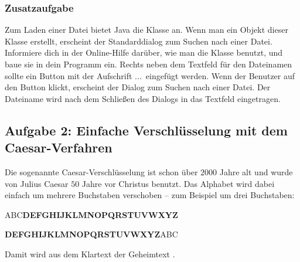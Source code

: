 \subsubsection{Zusatzaufgabe}

Zum Laden einer Datei bietet Java die Klasse  an. Wenn man
ein Objekt dieser Klasse erstellt, erscheint der Standarddialog zum Suchen nach
einer Datei. Informiere dich in der Online-Hilfe darüber, wie man die Klasse
 benutzt, und baue sie in dein Programm ein. Rechts neben
dem Textfeld für den Dateinamen sollte ein Button mit der Aufschrift
\glqq ...\grqq\ eingefügt werden. Wenn der Benutzer auf den Button klickt,
erscheint der Dialog zum Suchen nach einer Datei. Der Dateiname wird nach dem
Schließen des Dialogs in das Textfeld eingetragen.


\subsection{Aufgabe 2: Einfache Verschlüsselung mit dem Caesar-Verfahren}

Die sogenannte Caesar-Verschlüsselung ist schon über $2000$ Jahre alt und wurde von
Julius Caesar $50$ Jahre vor Christus benutzt. Das Alphabet wird dabei einfach um
mehrere Buchstaben verschoben -- zum Beispiel um drei Buchstaben:

ABC\textbf{DEFGHIJKLMNOPQRSTUVWXYZ}

\textbf{DEFGHIJKLMNOPQRSTUVWXYZ}ABC

Damit wird aus dem Klartext  der Geheimtext
.


